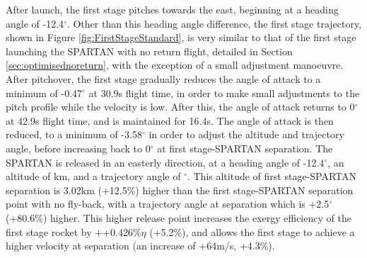  After launch, the first stage pitches towards the east, beginning at a heading angle of -12.4$^\circ$.
 Other than this heading angle difference, the first stage trajectory, shown in Figure \ref{fig:FirstStageStandard}, is very similar to that of the first stage launching the SPARTAN with no return flight, detailed in Section \ref{sec:optimisednoreturn}, with the exception of a small adjustment manoeuvre. 
 After pitchover, the first stage gradually reduces the angle of attack to a minimum of -0.47$^\circ$ at 30.9s flight time, in order to make small adjustments to the pitch profile while the velocity is low. After this, the angle of attack returns to 0$^\circ$ at 42.9s flight time, and is maintained for 16.4s.
 The angle of attack is then reduced, to a minimum of -3.58$^\circ$ in order to adjust the altitude and trajectory angle, before increasing back to 0$^\circ$ at first stage-SPARTAN separation. 
 The SPARTAN is released in an easterly direction, at a heading angle of -12.4$^\circ$, an altitude of \firstsecondSeparationAltStandard km, and a trajectory angle of \firstsecondSeparationgammaStandard $^\circ$. 
 This altitude of first stage-SPARTAN separation is 3.02km (+12.5\%) higher than the first stage-SPARTAN separation point with no fly-back, with a trajectory angle at separation which is +2.5$^\circ$ (+80.6\%) higher. 
 This higher release point increases the exergy efficiency of the first stage rocket by ++0.426\%$\eta$ (+5.2\%), and allows the first stage to achieve a higher velocity at separation (an increase of +64m/s, +4.3\%). 
 
